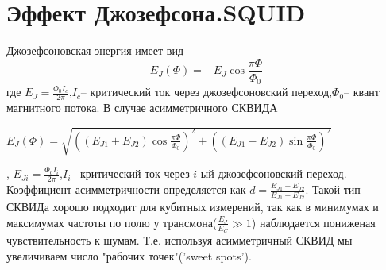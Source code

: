 \documentclass[12pt, a4paper, openany]{book}
\begin{document}
	\section{Эффект Джозефсона.SQUID}
	Джозефсоновская энергия имеет вид 
\begin{equation}
	E_J(\Phi)=-E_J\cos{\frac{\pi\Phi}{\Phi_0}}
	\label{eq:jos}	
\end{equation}	
	 где $E_J=\frac{\Phi_0I_c}{2\pi}$,$I_c$-- критический ток через джозефсоновский переход,$\Phi_0$-- квант магнитного потока. 
	В случае асимметричного СКВИДА
\begin{center}
	$E_J(\Phi)=\sqrt{((E_{J1}+E_{J2})\cos{\frac{\pi\Phi}{\Phi_0}})^2+
	((E_{J1}-E_{J2})\sin{\frac{\pi\Phi}{\Phi_0}})^2}$
\end{center}	 , $E_{Ji}=\frac{\Phi_0I_i}{2\pi}$,$I_i$-- критический ток через $i$-ый джозефсоновский переход.
Коэффициент асимметричности определяется как $d=\frac{E_{J1}-E_{J2}}{E_{J1}+E_{J2}}$. Такой тип СКВИДа хорошо подходит для кубитных измерений, так как в минимумах и максимумах частоты по полю  у трансмона($\frac{E_J}{E_C}\gg1$) наблюдается пониженая чувствительность к шумам. Т.е. используя асимметричный СКВИД мы увеличиваем число "рабочих точек"('sweet spots')\cite{Koch2007}.  
\end{document}
